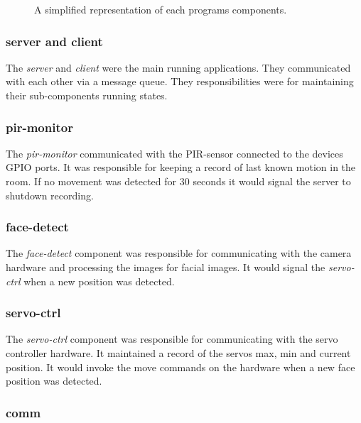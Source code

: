 \documentclass[11pt,a4paper,titlepage]{report}
\begin{document}
\begin{figure}
\begin{multicols}{2}
\columnbreak
{}
\end{multicols}
\caption{A simplified representation of each programs components.}\label{fig:processes}
\end{figure}

\subsubsection{server and client}

The \textit{server} and \textit{client} were the main running applications. They communicated with each other via a message queue. They responsibilities were for maintaining their sub-components running states.

\subsubsection{pir-monitor}

The \textit{pir-monitor} communicated with the PIR-sensor connected to the devices GPIO ports. It was responsible for keeping a record of last known motion in the room. If no movement was detected for 30 seconds it would signal the server to shutdown recording.

\subsubsection{face-detect}

The \textit{face-detect} component was responsible for communicating with the camera hardware and processing the images for facial images. It would signal the \textit{servo-ctrl} when a new position was detected.

\subsubsection{servo-ctrl}

The \textit{servo-ctrl} component was responsible for communicating with the servo controller hardware. It maintained a record of the servos max, min and current position. It would invoke the move commands on the hardware when a new face position was detected.

\subsubsection{comm}
\end{document}
